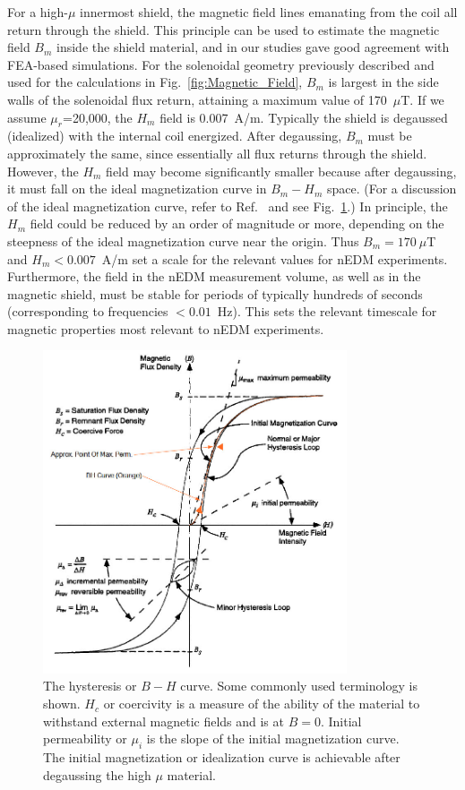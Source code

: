 For a high-$\mu$ innermost shield, the magnetic field lines emanating
from the coil all return through the shield.  This principle can be
used to estimate the magnetic field $B_m$ inside the shield material,
and in our studies gave good agreement with FEA-based simulations.
For the solenoidal geometry previously described and used for the
calculations in Fig.~\ref{fig:Magnetic_Field}, $B_m$ is largest in the
side walls of the solenoidal flux return, attaining a maximum value of
170~$\mu$T.  If we assume $\mu_r$=20,000, the $H_m$ field is
0.007~A/m.  Typically the shield is degaussed (idealized) with the
internal coil energized. After degaussing, $B_m$ must be approximately
the same, since essentially all flux returns through the shield.
However, the $H_m$ field may become significantly smaller because
after degaussing, it must fall on the ideal magnetization curve in
$B_m-H_m$ space.  (For a discussion of the ideal magnetization curve,
refer to Ref.~\cite{bozorth1993ferromagnetism} and see
Fig.~\ref{fig:bh}.)  In principle, the $H_m$ field could be reduced by
an order of magnitude or more, depending on the steepness of the ideal
magnetization curve near the origin.  Thus $B_m=170~\mu$T and
$H_m<0.007$~A/m set a scale for the relevant values for nEDM
experiments.  Furthermore, the field in the nEDM measurement volume,
as well as in the magnetic shield, must be stable for periods of
typically hundreds of seconds (corresponding to frequencies
$<0.01$~Hz). This sets the relevant timescale for magnetic properties
most relevant to nEDM experiments.


\begin{figure}[h!]
  \centering
  \includegraphics[width=0.8\textwidth]{bh.jpg}
  \caption[The hysteresis or $B-H$ curve]{The hysteresis or $B-H$
    curve. Some commonly used terminology is shown. $H_c$ or
    coercivity is a measure of the ability of the material to
    withstand external magnetic fields and is at $B=0$. Initial
    permeability or $\mu_i$ is the slope of the initial magnetization
    curve. The initial magnetization or idealization curve is
    achievable after degaussing the high $\mu$ material.}
  \label{fig:bh}
\end{figure}
